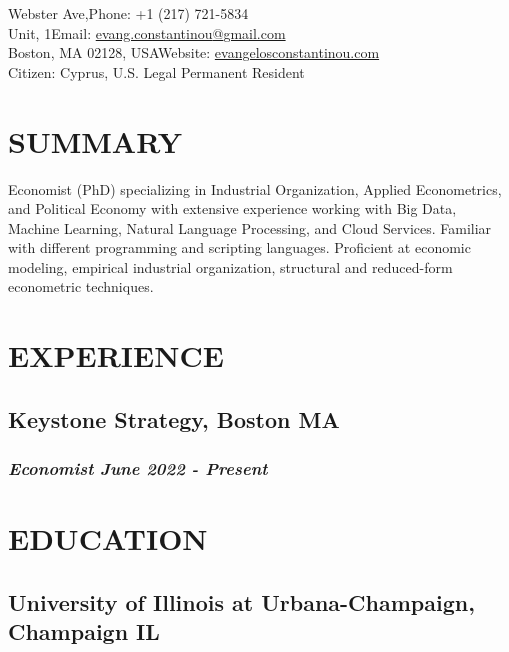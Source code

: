 \documentclass{article}
\makeatletter
\renewcommand{\maketitle}{
        \begin{center}
        {\huge\bfseries\theauthor}

        \vspace{0.25cm}


\noindent 15 Webster Ave,\hfill Phone: +1 (217) 721-5834\\
Unit, 1\hfill Email: \href{mailto:evang.constantinou@gmail.com}{evang.constantinou\textrm{@}gmail.com}\\
Boston, MA 02128, USA\hfill Website: \href{evangelosconstantinou.com}{evangelosconstantinou.com}\\
\hfill Citizen: Cyprus, U.S. Legal Permanent Resident
        \end{center}
}
\makeatother
\begin{document}
\author{Evangelos Constantinou}



\maketitle
\section{SUMMARY}
\noindent
Economist (PhD) specializing in Industrial Organization, Applied Econometrics, and Political Economy with extensive experience working with Big Data, Machine Learning, Natural Language Processing, and Cloud Services. Familiar with different programming and scripting languages. Proficient at economic modeling, empirical industrial organization, structural and reduced-form econometric techniques.

\section{EXPERIENCE}
\subsection{Keystone Strategy, Boston MA}
\subsubsection{\emph{Economist} \hfill \emph{June 2022 - Present}}

\section{EDUCATION}

\subsection{University of Illinois at Urbana-Champaign, Champaign IL}
\end{document}
